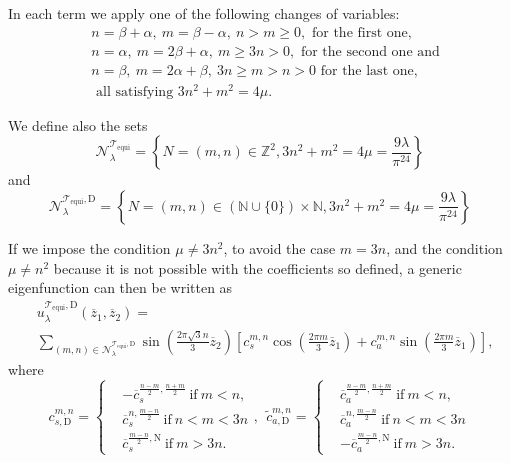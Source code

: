 \documentclass{amsart}
\theoremstyle{definition}
\theoremstyle{remark}
\renewcommand\geq\geqslant
\numberwithin{equation}{section}
\theoremstyle{definition}
\theoremstyle{remark}
\begin{document}
In each term we apply one of the following changes of variables:\begin{equation}
	\begin{aligned}
		&n=\beta+\alpha,\ m=\beta-\alpha,\ n>m\geq 0,\text{ for the first one,}
		\\&n=\alpha,\ m=2\beta+\alpha,\ m\geq 3n>0,\text{ for the second one and}
		\\&n=\beta,\ m=2\alpha+\beta,\ 3n\geq m>n>0\text{ for the last one,}
		\\&\text{ all satisfying }3n^2+m^2=4\mu.
	\end{aligned}
\end{equation}

We define also the sets \begin{equation}
	\mathcal{N}_\lambda^{\mathcal{T}_\mathrm{equi}}=\left\{N=(m,n)\in\mathbb{Z}^2, 3n^2+m^2=4\mu=\frac{9\lambda}{\pi^24}\right\}
\end{equation} and 
\begin{equation}
	\mathcal{N}_\lambda^{\mathcal{T}_\mathrm{equi},\mathrm{D}}=\left\{N=(m,n)\in\left(\mathbb{N}\cup\{0\}\right)\times\mathbb{N}, 3n^2+m^2=4\mu=\frac{9\lambda}{\pi^24}\right\}
\end{equation}

If we impose the condition $\mu\neq 3n^2$, to avoid the case $m=3n$, and the condition $\mu\neq n^2$ because it is not possible with the coefficients so defined, a generic eigenfunction can then be written as\begin{equation}
	\begin{aligned}
	    &u_\lambda^{\mathcal{T}_\mathrm{equi},\mathrm{D}}\left(\overline{z}_1,\overline{z}_2\right)=\\&\sum_{(m,n)\in	\mathcal{N}_\lambda^{\mathcal{T}_\mathrm{equi},\mathrm{D}}}\sin\left(\frac{2\pi\sqrt{3}n}{3}\overline{z}_2\right)\left[c_s^{m,n}\cos\left(\frac{2\pi m}{3}\overline{z}_1\right)+c_a^{m,n}\sin\left(\frac{2\pi m}{3}\overline{z}_1\right)\right],
	\end{aligned}
\end{equation}where
\begin{equation}
	c_{s,\mathrm{D}}^{m,n}=\left\{	\begin{aligned}
		&-\overline{c}_s^{\frac{n-m}{2},\frac{n+m}{2}}\ \text{if}\ m<n,\\&\overline{c}_s^{n,\frac{m-n}{2}}\ \text{if}\ n<m<3n\\&\overline{c}_s^{\frac{m-n}{2},\mathrm{N}}\ \text{if}\ m>3n.
	\end{aligned}\right.,\ \
	\tilde{c}_{a,\mathrm{D}}^{m,n}=\left\{	\begin{aligned}
			&\overline{c}_a^{\frac{n-m}{2},\frac{n+m}{2}}\ \text{if}\ m<n,\\&\overline{c}_a^{n,\frac{m-n}{2}}\ \text{if}\ n<m<3n\\&-\overline{c}_a^{\frac{m-n}{2},\mathrm{N}}\ \text{if}\ m>3n.
	\end{aligned}\right.
\end{equation}
\end{document}
